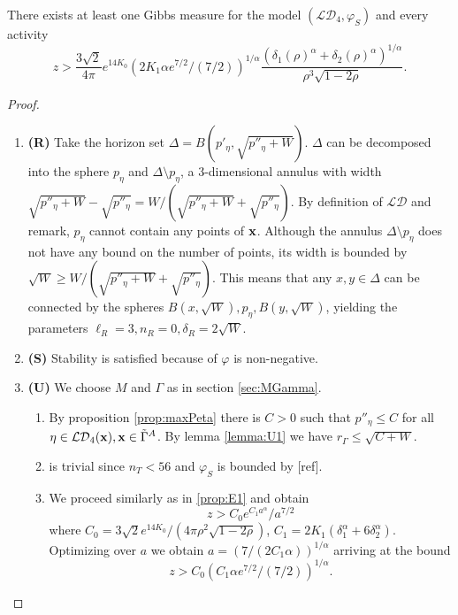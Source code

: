 \begin{proposition}\label{prop:E3}
	There exists at least one Gibbs measure for the model $(\mathcal {LD}_4,\varphi_S)$ and every activity 
	$$z> \frac{3\sqrt 2}{4\pi}e^{14 K_0}   (2K_1 \alpha e^{7/2}/(7/2))^{1/\alpha} \frac{(\delta_1(\rho)^\alpha + \delta_2(\rho)^\alpha)^{1/\alpha}}{\rho^3 \sqrt{1-2\rho}}.$$
\end{proposition}
\begin{proof}
\begin{enumerate}[]
	\item \textbf{(R)} Take the horizon set $\Delta = B(p'_\eta, \sqrt{p''_\eta + W})$. $\Delta$ can be decomposed into the sphere $p_\eta$ and $\Delta \setminus p_\eta$, a 3-dimensional annulus with width $\sqrt{p''_\eta+W} -\sqrt{p''_\eta}=W/(\sqrt{p''_\eta+W} + \sqrt{p''_\eta})$. By definition of $\mathcal {LD}$ and remark, $p_\eta$  cannot contain any points of ${\mathbf{x}}$.  Although the annulus $\Delta \setminus p_\eta$ does not have any bound on the number of points, its width is bounded by $\sqrt W \geq  W/(\sqrt{p''_\eta+W} + \sqrt{p''_\eta})$. This means that any $x,y\in \Delta$ can be connected by the spheres $B(x,\sqrt W), p_\eta, B(y,\sqrt W)$, yielding the parameters $\ell_R = 3,n_R=0,\delta_R=2\sqrt W$.
	\item \textbf{(S)} Stability is satisfied because of $\varphi$ is non-negative.
	\item \textbf{(U)} We choose $M$ and $\Gamma$ as in section \ref{sec:MGamma}.
		\begin{enumerate}[(U1)]
			\item By proposition \ref{prop:maxPeta} there is $C>0$ such that $p''_\eta\leq C$ for all $\eta \in \mathcal {LD}_4({\mathbf{x}}), {\mathbf{x}} \in \tilde\Gamma^A$. By lemma \ref{lemma:U1} we have $r_\Gamma\leq \sqrt{C + W}$.
			\item is trivial since $n_T<56$ and $\varphi_{S}$ is bounded by [ref].
			\item We proceed similarly as in \ref{prop:E1} and obtain
				$$z>C_0 e^{C_1 a^\alpha} / a^{7/2}$$
				where $C_0=3 \sqrt 2 e^{14K_0} / (4\pi \rho^2 \sqrt{1-2\rho})$, $C_1 = 2K_1(\delta_1^\alpha + 6\delta_2^\alpha)$. Optimizing over $a$ we obtain $a=(7/(2C_1\alpha))^{1/\alpha}$ arriving at the bound
				$$z> C_0 (C_1 \alpha e^{7/2} / (7/2))^{1/\alpha}.$$
		\end{enumerate}
\end{enumerate}
\end{proof}



